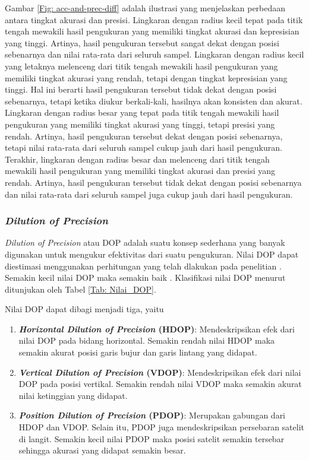 Gambar \ref{Fig: acc-and-prec-diff} adalah ilustrasi yang menjelaskan perbedaan antara tingkat akurasi dan presisi. Lingkaran dengan radius kecil tepat pada titik tengah mewakili hasil pengukuran yang memiliki tingkat akurasi dan kepresisian yang tinggi. Artinya, hasil pengukuran tersebut sangat dekat dengan posisi sebenarnya dan nilai rata-rata dari seluruh sampel. Lingkaran dengan radius kecil yang letaknya melenceng dari titik tengah mewakili hasil pengukuran yang memiliki tingkat akurasi yang rendah, tetapi dengan tingkat kepresisian yang tinggi. Hal ini berarti hasil pengukuran tersebut tidak dekat dengan posisi sebenarnya, tetapi ketika diukur berkali-kali, hasilnya akan konsisten dan akurat. Lingkaran dengan radius besar yang tepat pada titik tengah mewakili hasil pengukuran yang memiliki tingkat akurasi yang tinggi, tetapi presisi yang rendah. Artinya, hasil pengukuran tersebut dekat dengan posisi sebenarnya, tetapi nilai rata-rata dari seluruh sampel cukup jauh dari hasil pengukuran. Terakhir, lingkaran dengan radius besar dan melenceng dari titik tengah mewakili hasil pengukuran yang memiliki tingkat akurasi dan presisi yang rendah. Artinya, hasil pengukuran tersebut tidak dekat dengan posisi sebenarnya dan nilai rata-rata dari seluruh sampel juga cukup jauh dari hasil pengukuran.

\subsubsection{\textit{Dilution of Precision}}
\textit{Dilution of Precision} atau DOP adalah suatu konsep sederhana yang banyak digunakan untuk mengukur efektivitas dari suatu pengukuran. Nilai DOP dapat diestimasi menggunakan perhitungan yang telah dlakukan pada penelitian \cite{Tahsin2015} . Semakin kecil nilai DOP maka semakin baik \cite{Hofmann-Wellenhof2008}. Klasifikasi nilai DOP menurut \cite{Langley1999} ditunjukan oleh Tabel \ref{Tab: Nilai_DOP}.

Nilai DOP dapat dibagi menjadi tiga, yaitu
\begin{enumerate}
	\item \textbf{\textit{Horizontal Dilution of Precision} (HDOP)}: Mendeskripsikan efek dari nilai DOP pada bidang horizontal. Semakin rendah nilai HDOP maka semakin akurat posisi garis bujur dan garis lintang yang didapat.
	\item \textbf{\textit{Vertical Dilution of Precision} (VDOP)}: Mendeskripsikan efek dari nilai DOP pada posisi vertikal. Semakin rendah nilai VDOP maka semakin akurat nilai ketinggian yang didapat.
	\item \textbf{\textit{Position Dilution of Precision} (PDOP)}: Merupakan gabungan dari HDOP dan VDOP. Selain itu, PDOP juga mendeskripsikan persebaran satelit di langit. Semakin kecil nilai PDOP maka posisi satelit semakin tersebar sehingga akurasi yang didapat semakin besar.
\end{enumerate}

